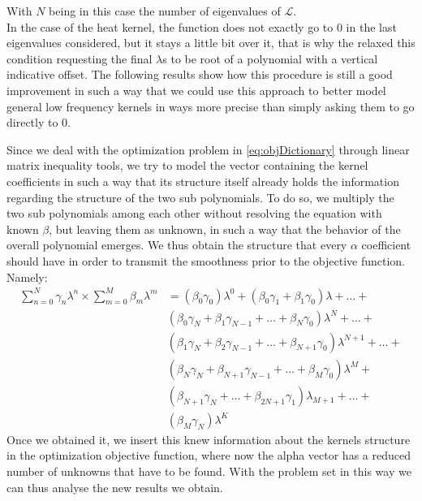 With $N$ being in this case the number of eigenvalues of $\mathcal{L}$.\\
In the case of the heat kernel, the function does not exactly go to 0 in the last eigenvalues considered, but it stays a little bit over it, that is why the relaxed this condition requesting the final $\lambda$s to be root of a polynomial with a vertical indicative offset. The following results show how this procedure is still a good improvement in such a way that we could use this approach to better model general low frequency kernels in ways more precise than simply asking them to go directly to 0.

Since we deal with the optimization problem in \autoref{eq:objDictionary} through linear matrix inequality tools, we try to model the vector containing the kernel coefficients in such a way that its structure itself already holds the information regarding the structure of the two sub polynomials. To do so, we multiply the two sub polynomials among each other without resolving the equation with known $\beta$, but leaving them as unknown, in such a way that the behavior of the overall polynomial emerges. We thus obtain the structure that every $\alpha$ coefficient should have in order to transmit the smoothness prior to the objective function. Namely:
\begin{equation}
  \begin{split}
    \sum_{n=0}^N\gamma_n \lambda^n \times \sum_{m=0}^M \beta_m \lambda^m &= (\beta_0  \gamma_0)\lambda^0   + (\beta_0 \gamma_1 + \beta_1 \gamma_0)\lambda + \dots + \\
    &(\beta_0 \gamma_N + \beta_1 \gamma_{N-1} + \dots + \beta_N \gamma_0)\lambda^N + \dots + \\
    &(\beta_1 \gamma_N + \beta_2 \gamma_{N-1} + \dots + \beta_{N+1} \gamma_0)\lambda^{N+1} + \dots +\\
    &(\beta_{N} \gamma_{N} + \beta_{N+1} \gamma_{N-1} + \dots + \beta_{M} \gamma_0)\lambda^{M} + \\
    &(\beta_{N+1} \gamma_{N} + \dots + \beta_{2N + 1} \gamma_1)\lambda_{M+1} + \dots +\\
    &(\beta_M \gamma_N)\lambda^{K}
  \end{split}
  \label{eq:sviluppo}
\end{equation}
Once we obtained it, we insert this knew information about the kernels structure in the optimization objective function, where now the alpha vector has a reduced number of unknowns that have to be found. With the problem set in this way we can thus analyse the new results we obtain. 

